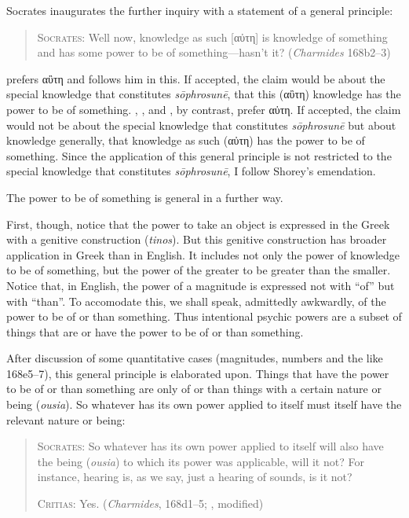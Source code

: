 Socrates inaugurates the further inquiry with a statement of a general principle:
\begin{quote}
	\textsc{Socrates}: Well now, knowledge as such [{\sbl αὐτη}] is knowledge of something and has some power to be of something—hasn't it? (\emph{Charmides} 168b2–3)
\end{quote}
\citet{Burnet:1903aa} prefers {\sbl αὒτη} and \citet[60]{Lamb:1927qw} follows him in this. If accepted, the claim would be about the special knowledge that constitutes \emph{sōphrosunē}, that this ({\sbl αὒτη}) knowledge has the power to be of something. \citet{Shorey:1907ys}, \citet[55]{Ben:1985aa}, and \citet[220 n23]{Tuozzo:2011aa}, by contrast, prefer {\sbl αὐτη}. If accepted, the claim would not be about the special knowledge that constitutes \emph{sōphrosunē} but about knowledge generally, that knowledge as such ({\sbl αὐτη}) has the power to be of something. Since the application of this general principle is not restricted to the special knowledge that constitutes \emph{sōphrosunē}, I follow Shorey's emendation.

The power to be of something is general in a further way.

First, though, notice that the power to take an object is expressed in the Greek with a genitive construction (\emph{tinos}). But this genitive construction has broader application in Greek than in English. It includes not only the power of knowledge to be of something, but the power of the greater to be greater than the smaller. Notice that, in English, the power of a magnitude is expressed not with ``of'' but with ``than''. To accomodate this, we shall speak, admittedly awkwardly, of the power to be of or than something. Thus intentional psychic powers are a subset of things that are or have the power to be of or than something.

After discussion of some quantitative cases (magnitudes, numbers and the like 168e5–7), this general principle is elaborated upon. Things that have the power to be of or than something are only of or than things with a certain nature or being (\emph{ousia}). So whatever has its own power applied to itself must itself have the relevant nature or being:
\begin{quotation}
	\textsc{Socrates}: So whatever has its own power applied to itself will also have the being (\emph{ousia}) to which its power was applicable, will it not? For instance, hearing is, as we say, just a hearing of sounds, is it not?
	
	\textsc{Critias}: Yes. (\emph{Charmides}, 168d1–5; \citealt[63]{Lamb:1927qw}, modified)
\end{quotation}

